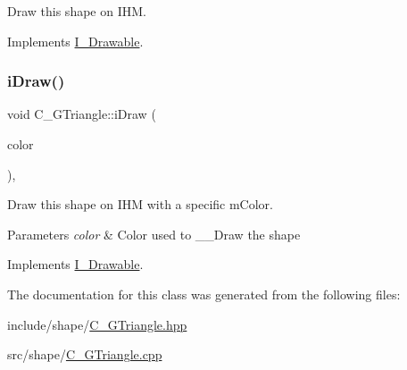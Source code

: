 Draw this shape on I\+HM. 



Implements \hyperlink{classI__Drawable_ae24c65000977a805f52ce032321cd86f}{I\+\_\+\+Drawable}.

\mbox{\label{classC__GTriangle_a9cfd20cb1d19e6c92bd217c470c86405}} 
\subsubsection{\texorpdfstring{i\+Draw()}{iDraw()}\hspace{0.1cm}{\footnotesize\ttfamily [2/2]}}
{\footnotesize\ttfamily void C\+\_\+\+G\+Triangle\+::i\+Draw (\begin{DoxyParamCaption}\item[{M\+L\+V\+\_\+\+Color}]{color }\end{DoxyParamCaption})\hspace{0.3cm}{\ttfamily [override]}, {\ttfamily [virtual]}}



Draw this shape on I\+HM with a specific m\+Color. 


\begin{DoxyParams}{Parameters}
{\em color} & Color used to \+\_\+\+\_\+\+Draw the shape \\
\hline
\end{DoxyParams}


Implements \hyperlink{classI__Drawable_a25f6474325614c451a91f019e5fe8010}{I\+\_\+\+Drawable}.



The documentation for this class was generated from the following files\+:\begin{DoxyCompactItemize}
\item 
include/shape/\hyperlink{C__GTriangle_8hpp}{C\+\_\+\+G\+Triangle.\+hpp}\item 
src/shape/\hyperlink{C__GTriangle_8cpp}{C\+\_\+\+G\+Triangle.\+cpp}\end{DoxyCompactItemize}
